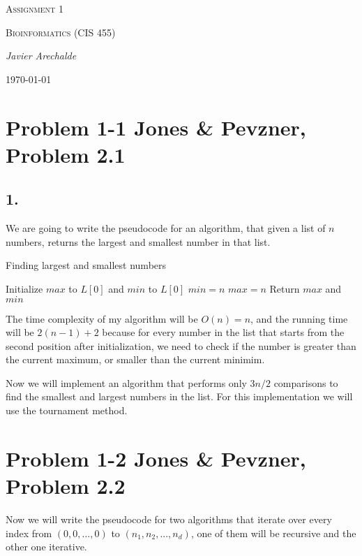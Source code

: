 \documentclass{article}
\begin{document}
\begin{titlepage}
	\centering
	{\scshape\LARGE Assignment 1\par}
	\vspace{1cm}
	{\scshape\Large Bioinformatics (CIS 455)\par}
	\vspace{1.5cm}
	{\Large\itshape Javier Arechalde\par}
	\vfill
	{\large \today\par}
\end{titlepage}

\section*{Problem 1-1 Jones \& Pevzner, Problem 2.1}
  
\subsection*{1.}

We are going to write the pseudocode for an algorithm, that given a list of $n$ numbers, returns the largest and smallest number in that list.

\begin{algorithm}[H]
\caption{Finding largest and smallest numbers}
\begin{algorithmic}[1]
\State Initialize $max$ to $L[0]$ and $min$ to $L[0]$
  \State $min = n$
 \EndIf 
  \State $max = n$
 \EndIf
\EndFor
\State Return $max$ and $min$
\end{algorithmic}
\end{algorithm}

The time complexity of my algorithm will be $O(n) = n$, and the running time will be $2(n-1)+2$ because for every number in the list that starts from the second position after initialization, we need to check if the number is greater than the current maximum, or smaller than the current minimim.

Now we will implement an algorithm that performs only $3n/2$ comparisons to find the smallest and largest numbers in the list. For this implementation we will use the tournament method.

\section*{Problem 1-2 Jones \& Pevzner, Problem 2.2}

Now we will write the pseudocode for two algorithms that iterate over every index from $(0,0,...,0)$ to $(n_1,n_2,...,n_d)$, one of them will be recursive and the other one iterative.
\end{document}
